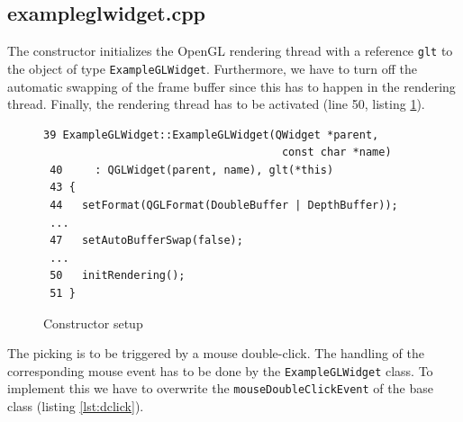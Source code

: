 \documentclass[jou,noapacite]{apa}
\begin{document}
\subsection{exampleglwidget.cpp}

The constructor initializes the OpenGL rendering thread with a
reference \lstinline|glt| to the object of type \lstinline|ExampleGLWidget|.
%
Furthermore, we have to turn off the automatic swapping of the frame buffer
since this has to happen in the rendering thread. Finally, the rendering thread
has to be activated (line 50, listing \ref{lst:ctor}).
%
\begin{figure}[h]
\begin{lstlisting}[basicstyle=\scriptsize]
 39 ExampleGLWidget::ExampleGLWidget(QWidget *parent,
                                     const char *name)
 40     : QGLWidget(parent, name), glt(*this)
 43 {
 44   setFormat(QGLFormat(DoubleBuffer | DepthBuffer));
 ...
 47   setAutoBufferSwap(false);
 ...
 50   initRendering();
 51 }
\end{lstlisting}
\caption{Constructor setup}
\label{lst:ctor}
\end{figure}

The picking is to be triggered by a mouse double-click.
%
The handling of the corresponding mouse event has to be done by
the \lstinline|ExampleGLWidget| class.
%
To implement this we have to overwrite the \lstinline|mouseDoubleClickEvent| of
the base class (listing \ref{lst:dclick}).
\end{document}
